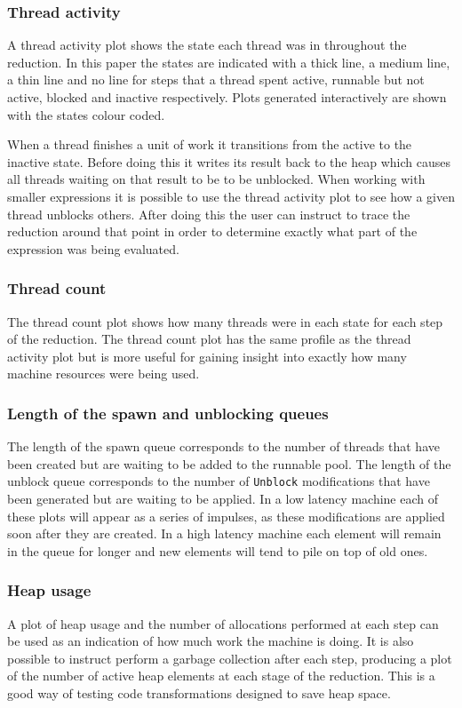 \documentclass{llncs}
\begin{document}
\subsubsection{Thread activity}
A thread activity plot shows the state each thread was in throughout the reduction. In this paper the states are indicated with a thick line, a medium line, a thin line and no line for steps that a thread spent active, runnable but not active, blocked and inactive respectively. Plots generated interactively are shown with the states colour coded. 

When a thread finishes a unit of work it transitions from the active to the inactive state. Before doing this it writes its result back to the heap which causes all threads waiting on that result to be to be unblocked. When working with smaller expressions it is possible to use the thread activity plot to see how a given thread unblocks others. After doing this the user can instruct \ample to trace the reduction around that point in order to determine exactly what part of the expression was being evaluated.

\subsubsection{Thread count}
The thread count plot shows how many threads were in each state for each step of the reduction. The thread count plot has the same profile as the thread activity plot but is more useful for gaining insight into exactly how many machine resources were being used.  

\subsubsection{Length of the spawn and unblocking queues}
The length of the spawn queue corresponds to the number of threads that have been created but are waiting to be added to the runnable pool. The length of the unblock queue corresponds to the number of \texttt{Unblock} modifications that have been generated but are waiting to be applied. In a low latency machine each of these plots will appear as a series of impulses, as these modifications are applied soon after they are created. In a high latency machine each element will remain in the queue for longer and new elements will tend to pile on top of old ones.

\subsubsection{Heap usage}
A plot of heap usage and the number of allocations performed at each step can be used as an indication of how much work the machine is doing. It is also possible to instruct \ample perform a garbage collection after each step, producing a plot of the number of active heap elements at each stage of the reduction. This is a good way of testing code transformations designed to save heap space.
\end{document}
